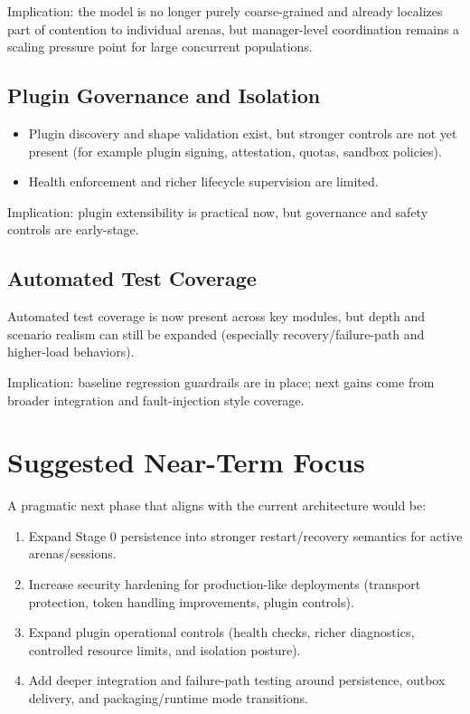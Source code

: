 \documentclass[11pt]{article}
\begin{document}
Implication: the model is no longer purely coarse-grained and already localizes part of contention to individual arenas, but manager-level coordination remains a scaling pressure point for large concurrent populations.

\subsection{Plugin Governance and Isolation}
\begin{itemize}[leftmargin=*]
  \item Plugin discovery and shape validation exist, but stronger controls are not yet present (for example plugin signing, attestation, quotas, sandbox policies).
  \item Health enforcement and richer lifecycle supervision are limited.
\end{itemize}

Implication: plugin extensibility is practical now, but governance and safety controls are early-stage.

\subsection{Automated Test Coverage}
Automated test coverage is now present across key modules, but depth and scenario realism can still be expanded (especially recovery/failure-path and higher-load behaviors).

Implication: baseline regression guardrails are in place; next gains come from broader integration and fault-injection style coverage.

\section{Suggested Near-Term Focus}
A pragmatic next phase that aligns with the current architecture would be:
\begin{enumerate}[leftmargin=*]
  \item Expand Stage 0 persistence into stronger restart/recovery semantics for active arenas/sessions.
  \item Increase security hardening for production-like deployments (transport protection, token handling improvements, plugin controls).
  \item Expand plugin operational controls (health checks, richer diagnostics, controlled resource limits, and isolation posture).
  \item Add deeper integration and failure-path testing around persistence, outbox delivery, and packaging/runtime mode transitions.
\end{enumerate}
\end{document}
